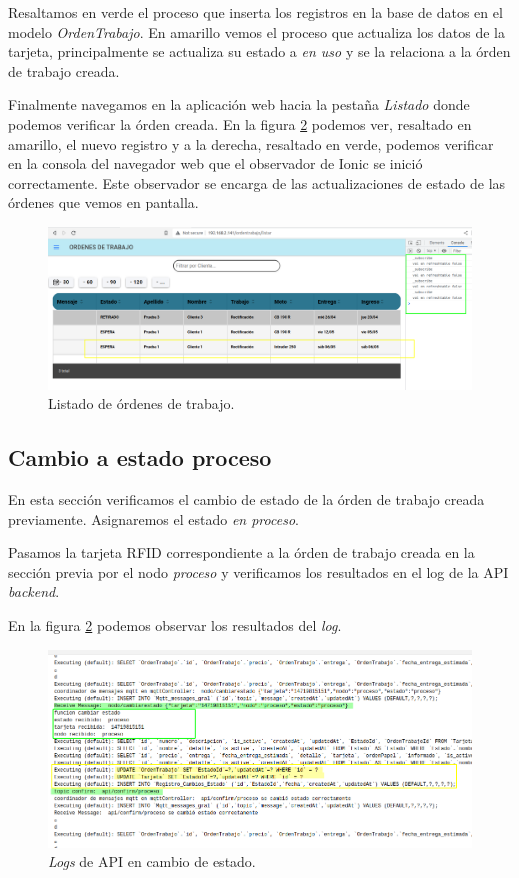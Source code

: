 Resaltamos en verde el proceso que inserta los registros en la base de datos en el modelo \textit{OrdenTrabajo}. En amarillo vemos el proceso que actualiza los datos de la tarjeta, principalmente se actualiza su estado a \textit{en uso} y se la relaciona a la órden de trabajo creada.

Finalmente navegamos en la aplicación web hacia la pestaña \textit{Listado} donde podemos verificar la órden creada. En la figura \ref{fig:ensayolistado} podemos ver, resaltado en amarillo, el nuevo registro y a la derecha, resaltado en verde, podemos verificar en la consola del navegador web que el observador de Ionic se inició correctamente. Este observador se encarga de las actualizaciones de estado de las órdenes que vemos en pantalla.

\begin{figure}[H]
	\centering
	\includegraphics[width=\textwidth]{./Figures/ensayo-1/11.listado.png}
	\caption{Listado de órdenes de trabajo.}
	\label{fig:ensayolistado}
\end{figure}

\subsection{Cambio a estado proceso}
\label{subsec:ensayoaproceso}

En esta sección verificamos el cambio de estado de la órden de trabajo creada previamente. Asignaremos el estado \textit{en proceso}.

Pasamos la tarjeta RFID correspondiente a la órden de trabajo creada en la sección previa por el nodo \textit{proceso} y verificamos los resultados en el log de la API \textit{backend}.

En la figura \ref{fig:ensayolistado} podemos observar los resultados del \textit{log}.

\begin{figure}[H]
	\centering
	\includegraphics[width=\textwidth]{./Figures/ensayo-1/12.cambioestado-api-log.png}
	\caption{\textit{Logs} de API en cambio de estado.}
	\label{fig:ensayolistado}
\end{figure}

